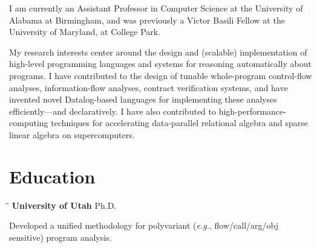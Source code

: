 \documentclass[line]{res}
\begin{document}

\address{\bf gilray.org
\ \ \ \ \ \ \ \ }
                                  
\begin{resume}        

\vspace{-0.1in}  
I am currently an Assistant Professor in Computer Science at the University of Alabama at Birmingham, and was previously a Victor Basili Fellow at the University of Maryland, at College Park.

My research interests center around the design and (scalable) implementation of high-level programming languages and systems for reasoning automatically about programs. I have contributed to the design of tunable whole-program control-flow analyses, information-flow analyses, contract verification systems, and have invented novel Datalog-based languages for implementing these analyses efficiently---and declaratively. I have also contributed to high-performance-computing techniques for accelerating data-parallel relational algebra and sparse linear algebra on supercomputers.

\section{\large Education}          
    \vspace{-0.1cm}	
    \begin{tabbing}
    \hspace{2.25in}\= \hspace{2.25in}\= \kill %
    {\bf University of Utah} \>Ph.D.     
    \end{tabbing}\vspace{-0.5cm}
    Developed a unified methodology for polyvariant (\textit{e.g.}, flow/call/arg/obj sensitive) program analysis.%
    

\end{resume}
\end{document}
